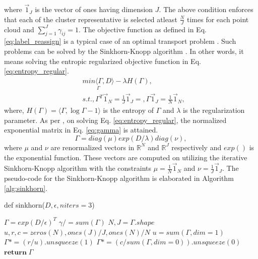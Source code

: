 where $\vec{1}_{J}$ is the vector of ones having dimension $J$. The above condition enforces that each of the cluster representative is  selected atleast $\frac{N}{J}$ times for each point cloud and $\sum_{j=1}^{J}\gamma_{ij}=1$. The objective function as defined in Eq.\ref{eq:label_reassign} is a typical case of an optimal transport problem \cite{peyre2019computational}. Such problems can be solved by the Sinkhorn-Knopp algorithm \cite{cuturi2013sinkhorn}. In other words, it means solving the entropic regularized objective function in Eq. \ref{eq:entropy_regular}.
\begin{equation}
    \label{eq:entropy_regular}
    \begin{split}
        &\underset{\Gamma}{min \langle \Gamma, D \rangle} - \lambda \mathit{H}(\Gamma),\\
        &s.t., \Gamma^{T}\vec{1}_{\mathit{N}} = \frac{1}{\mathit{J}}\vec{1}_{J} =, \Gamma\vec{1}_{J} = \frac{1}{\mathit{N}}\vec{1}_{\mathit{N}},
    \end{split}    
\end{equation}
where, $\mathit{H}(\Gamma) = \langle \Gamma, \log \Gamma -1 \rangle $ is the entropy of $\Gamma$ and $\lambda$ is the regularization parameter. As per \cite{cuturi2013sinkhorn}, on solving Eq. \ref{eq:entropy_regular}, the normalized exponential matrix in Eq. \ref{eq:gamma} is attained. 
\begin{equation}
    \label{eq:gamma}
    \Gamma = diag(\mu) exp(\mathit{D/\lambda}) diag(\nu),
\end{equation}
where $\mu$ and $\nu$ are renormalized vectors in $\mathbb{R}^N$ and $\mathbb{R}^J$ respectively and $exp()$ is the exponential function. These vectors are computed on utilizing the iterative Sinkhorn-Knopp algorithm\cite{cuturi2013sinkhorn} with the constraints $ \mu = \frac{1}{\mathit{N}} \vec{1}_{\mathit{N}} $ and $ \nu = \frac{1}{\mathit{J}} \vec{1}_{\mathit{J}} $. The pseudo-code for the Sinkhorn-Knopp algorithm is elaborated in Algorithm \ref{alg:sinkhorn}.

\begin{algorithm}[h]
    \caption{Pseudo-code for Sinkhorn-Knopp algorithm}\label{alg:sinkhorn}
    def sinkhorn($D, \epsilon, niters=3$)
    \begin{algorithmic}[1]
        \State $\Gamma = exp(D/ \epsilon)^T$
        \State $\gamma /= sum(\Gamma)$
        \State $N, J = \Gamma .shape$
        \State $u,r,c = zeros(N), ones(J)/J, ones(N)/N$
            \State $u = sum(\Gamma, dim=1)$
            \State $\Gamma *= (r/u).unsqueeze(1)$
            \State $\Gamma *= (c/sum(\Gamma, dim=0)).unsqueeze(0)$            
        \EndFor
        \State $\mathbf{return} \; \Gamma$          
    \end{algorithmic}
\end{algorithm}

